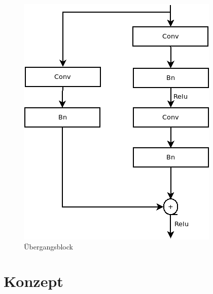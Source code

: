 \begin{figure}[h]
\begin{minipage}[b]{.4\linewidth}
      \includegraphics[width=0.8\linewidth]{KapitelPartB/Images/Ubergangsblock.png}
      \caption{Übergangsblock}
   \end{minipage}
   \label{abb:blocks}
\end{figure}

\section{Konzept}



\color{black}
